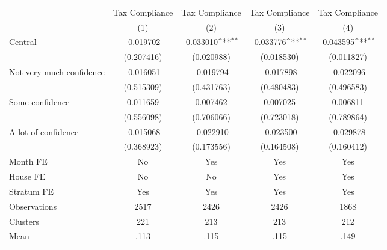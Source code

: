 {
\def\sym#1{\ifmmode^{#1}\else\(^{#1}\)\fi}
\begin{tabular}{l*{4}{c}}
\toprule
                &\multicolumn{1}{c}{Tax Compliance}&\multicolumn{1}{c}{Tax Compliance}&\multicolumn{1}{c}{Tax Compliance}&\multicolumn{1}{c}{Tax Compliance}\\
                &\multicolumn{1}{c}{(1)}         &\multicolumn{1}{c}{(2)}         &\multicolumn{1}{c}{(3)}         &\multicolumn{1}{c}{(4)}         \\
\midrule
Central         &-0.019702         &-0.033010\sym{**} &-0.033776\sym{**} &-0.043595\sym{**} \\
                &(0.207416)         &(0.020988)         &(0.018530)         &(0.011827)         \\
Not very much confidence&-0.016051         &-0.019794         &-0.017898         &-0.022096         \\
                &(0.515309)         &(0.431763)         &(0.480483)         &(0.496583)         \\
Some confidence & 0.011659         & 0.007462         & 0.007025         & 0.006811         \\
                &(0.556098)         &(0.706066)         &(0.723018)         &(0.789864)         \\
A lot of confidence&-0.015068         &-0.022910         &-0.023500         &-0.029878         \\
                &(0.368923)         &(0.173556)         &(0.164508)         &(0.160412)         \\
Month FE        &       No         &      Yes         &      Yes         &      Yes         \\
House FE        &       No         &       No         &      Yes         &      Yes         \\
Stratum FE      &      Yes         &      Yes         &      Yes         &      Yes         \\
\midrule
Observations    &     2517         &     2426         &     2426         &     1868         \\
Clusters        &      221         &      213         &      213         &      212         \\
Mean            &     .113         &     .115         &     .115         &     .149         \\
\bottomrule
\end{tabular}
}
